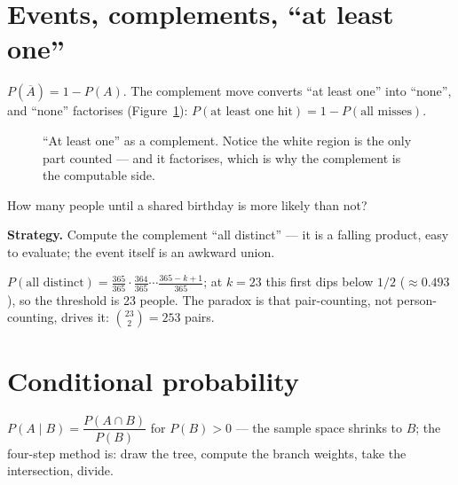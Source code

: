 \section{Events, complements, ``at least one''}\label{sec:complement}
$P(\overline{A}) = 1 - P(A)$. The complement move converts ``at least
one'' into ``none'', and ``none'' factorises
(Figure~\ref{fig:complement}): $P(\text{at least one hit}) =
1 - P(\text{all misses})$.

\begin{figure}[ht]\centering

\caption{``At least one'' as a complement. Notice the white region is
the only part counted --- and it factorises, which is why the
complement is the computable side.}
\label{fig:complement}
\end{figure}

\begin{example}\label{ex:birthday}
How many people until a shared birthday is more likely than not?
\par\smallskip
\textbf{Strategy.} Compute the complement ``all distinct'' --- it is a
falling product, easy to evaluate; the event itself is an awkward
union.
\par\smallskip
\begin{solution}
$P(\text{all distinct}) = \frac{365}{365}\cdot\frac{364}{365}\cdots
\frac{365-k+1}{365}$; at $k = 23$ this first dips below $1/2$
($\approx 0.493$), so the threshold is 23 people. The paradox is that
pair-counting, not person-counting, drives it: $\binom{23}{2} = 253$
pairs.
\end{solution}
\end{example}

\section{Conditional probability}\label{sec:cond}
\begin{definition}
$P(A \mid B) = \dfrac{P(A \cap B)}{P(B)}$ for $P(B) > 0$ ---
the sample space shrinks to $B$; the four-step method is: draw the
tree, compute the branch weights, take the intersection, divide.
\end{definition}

